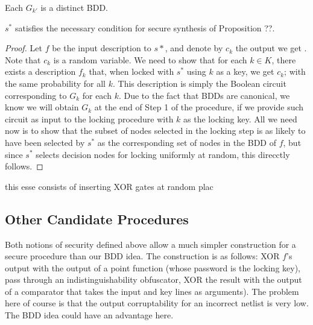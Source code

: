 \begin{lemma}
Each $G_{k'}$ is a distinct BDD.
\end{lemma}

\begin{theorem}
$s^{*}$ satisfies the necessary condition for secure synthesis of Proposition ??.
\end{theorem}

\begin{proof}
Let $f$ be the input description to $s*$, and denote by $c_k$ the output we get . Note that $c_k$ is a random variable. We need to show that for each $k\in K$, there exists a description $f_k$ that, when locked with $s^{*}$ using $k$ as a key, we get $c_k$; with the same probability for all $k$. This description is simply the Boolean circuit corresponding to $G_{k}$ for each $k$. Due to the fact that BDDs are canonical, we know we will obtain $G_{k}$ at the end of Step 1 of the procedure, if we provide such circuit as input to the locking procedure with $k$ as the locking key. All we need now is to show that the subset of nodes selected in the locking step is as likely to have been selected by $s^{*}$ as the corresponding set of nodes in the BDD of $f$, but since $s^{*}$ selects decision nodes for locking uniformly at random, this direcctly follows.
\end{proof}

this esse consists of inserting XOR gates at random plac


\subsection{Other Candidate Procedures}
Both notions of security defined above allow a much simpler construction for a secure procedure than our BDD idea. The construction is as follows: XOR $f$'s output with the output of a point function (whose password is the locking key), pass through an indistinguishability obfuscator, XOR the result with the output of a comparator that takes the input and key lines as arguments). The problem here of course is that the output corruptability for an incorrect netlist is very low. The BDD idea could have an advantage here.
